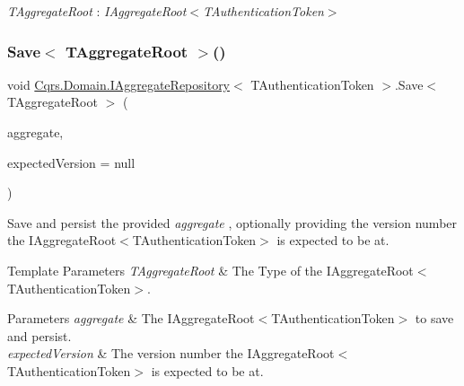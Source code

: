 \begin{Desc}
\item[Type Constraints]\begin{description}
\item[{\em T\+Aggregate\+Root} : {\em I\+Aggregate\+Root$<$T\+Authentication\+Token$>$}]\end{description}
\end{Desc}
\mbox{\label{interfaceCqrs_1_1Domain_1_1IAggregateRepository_a306baf8aa6faabe893f93e5db5d3517d_a306baf8aa6faabe893f93e5db5d3517d}} 
\subsubsection{\texorpdfstring{Save$<$ T\+Aggregate\+Root $>$()}{Save< TAggregateRoot >()}}
{\footnotesize\ttfamily void \hyperlink{interfaceCqrs_1_1Domain_1_1IAggregateRepository}{Cqrs.\+Domain.\+I\+Aggregate\+Repository}$<$ T\+Authentication\+Token $>$.Save$<$ T\+Aggregate\+Root $>$ (\begin{DoxyParamCaption}\item[{T\+Aggregate\+Root}]{aggregate,  }\item[{int?}]{expected\+Version = {\ttfamily null} }\end{DoxyParamCaption})}



Save and persist the provided {\itshape aggregate} , optionally providing the version number the I\+Aggregate\+Root$<$\+T\+Authentication\+Token$>$ is expected to be at. 


\begin{DoxyTemplParams}{Template Parameters}
{\em T\+Aggregate\+Root} & The Type of the I\+Aggregate\+Root$<$\+T\+Authentication\+Token$>$.\\
\hline
\end{DoxyTemplParams}

\begin{DoxyParams}{Parameters}
{\em aggregate} & The I\+Aggregate\+Root$<$\+T\+Authentication\+Token$>$ to save and persist.\\
\hline
{\em expected\+Version} & The version number the I\+Aggregate\+Root$<$\+T\+Authentication\+Token$>$ is expected to be at.\\
\hline
\end{DoxyParams}


